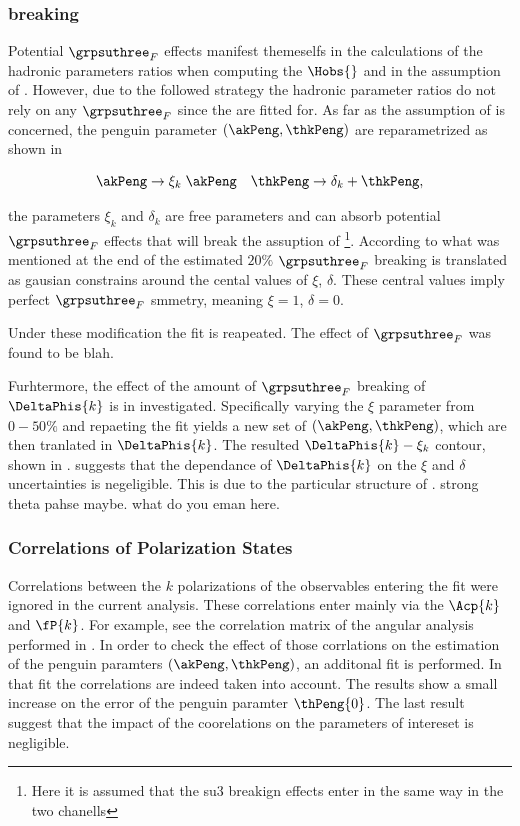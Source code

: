 \subsubsection{\grpsuthree breaking}
\label{su3_breaking}
Potential $\grpsuthree_F$ effects manifest themeselfs in the calculations of the hadronic parameters ratios
when computing the $\Hobs{}$ and in the assumption of . However, due to the followed strategy
the hadronic parameter ratios do not rely on any $\grpsuthree_F$ since the are fitted for.
As far as the assumption of  is concerned, the penguin parameter $(\akPeng,\thkPeng)$ are
reparametrized as shown in 

\begin{equation}
  \akPeng \to \xi_k \; \akPeng \quad \thkPeng \to \delta_k + \thkPeng,
\label{su3_breaking}
\end{equation}

\noindent the parameters $\xi_k$ and $\delta_k$ are free parameters and can absorb potential $\grpsuthree_F$ effects
that will break the assuption of \footnote{\color{red} Here it is assumed that the su3 breakign effects enter in the same way in the two chanells}.
According to what was mentioned at the end of  the estimated $20\%$ $\grpsuthree_F$ breaking
is translated as gausian constrains around the cental values of $\xi$, $\delta$. These central values imply perfect
$\grpsuthree_F$ smmetry, meaning $\xi=1$, $\delta=0$.

Under these modification the \chisq fit is reapeated. The effect of $\grpsuthree_F$ was found to be blah.

Furhtermore, the effect of the amount of $\grpsuthree_F$ breaking of $\DeltaPhis{k}$ is in investigated.
Specifically varying the $\xi$ parameter from $0-50\%$ and repaeting the fit yields a new set of
$(\akPeng,\thkPeng)$, which are then tranlated in $\DeltaPhis{k}$. The resulted $\DeltaPhis{k} - \xi_k$ contour,
shown in \figref{}. suggests that the dependance of $\DeltaPhis{k}$ on the $\xi$ and $\delta$
uncertainties is negeligible. This is due to the particular structure of . {\color{red}strong theta pahse maybe. what do you eman here.}

\subsubsection{Correlations of Polarization States}
Correlations between the $k$ polarizations of the observables entering the \chisq fit were ignored in the
current analysis. These correlations enter mainly via the $\Acp{k}$ and $\fP{k}$. For example, see the
correlation matrix  of the angular analysis performed in .
In order to check the effect of those corrlations on the estimation of the penguin paramters $(\akPeng,\thkPeng)$,
an additonal \chisq fit is performed. In that fit the correlations are indeed taken into account.
The results show a small increase on the error of the penguin paramter $\thPeng{0}$.
The last result suggest that the impact of the coorelations on the parameters of intereset is negligible.
